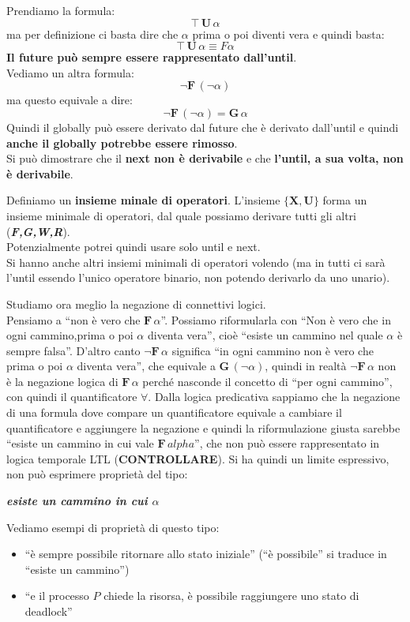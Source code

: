 \documentclass[a4paper,12pt, oneside]{book}
\begin{document}
Prendiamo la formula:
\[\top\,\mathbf{U}\,\alpha\]
ma per definizione ci basta dire che $\alpha$ prima o poi diventi vera e
quindi basta:
\[\top\,\mathbf{U}\,\alpha\equiv F\alpha\]
\textbf{Il future può sempre essere rappresentato dall'until}.\\
Vediamo un altra formula:
\[\neg\mathbf{F}\,(\neg\alpha)\]
ma questo equivale a dire:
\[\neg\mathbf{F}\,(\neg\alpha)=\mathbf{G}\,\alpha\]
Quindi il globally può essere derivato dal future che è derivato dall'until e
quindi \textbf{anche il globally potrebbe essere rimosso}.\\
Si può dimostrare che il \textbf{next non è derivabile} e che \textbf{l'until, a
  sua volta, non è derivabile}. 
\begin{definizione}
  Definiamo un \textbf{insieme minale di operatori}. L'insieme
  $\{\mathbf{X},\mathbf{U}\}$ forma un insieme minimale di operatori, dal quale
  possiamo derivare tutti gli altri (\textbf{\textit{F,G,W,R}}).\\
  Potenzialmente potrei quindi usare solo until e next.\\
  Si hanno anche altri insiemi minimali di operatori volendo (ma in tutti ci
  sarà l'until essendo l'unico operatore binario, non potendo derivarlo da uno
  unario). 
\end{definizione}
\noindent
Studiamo ora meglio la negazione di connettivi logici.\\
Pensiamo a ``non è vero che $\mathbf{F}\,\alpha$''. Possiamo riformularla con
``Non è vero che in ogni cammino,prima o poi $\alpha$ diventa vera'', cioè
``esiste un cammino nel quale $\alpha$ è sempre falsa''. D'altro canto
$\neg\mathbf{F}\,\alpha$ significa ``in ogni cammino non è vero che prima o poi
$\alpha$ diventa vera'', che equivale a $\mathbf{G}\,(\neg \alpha)$, quindi in
realtà $\neg\mathbf{F}\,\alpha$ non è la negazione logica di
$\mathbf{F}\,\alpha$ perché nasconde il concetto di ``per ogni cammino'', con
quindi il quantificatore $\forall$. Dalla logica predicativa sappiamo che la
negazione di una formula dove compare un quantificatore equivale a cambiare il
quantificatore e aggiungere la negazione e quindi la riformulazione giusta
sarebbe ``esiste un cammino in cui vale $\mathbf{F}\,alpha$'', che non può
essere rappresentato in logica temporale LTL (\textbf{CONTROLLARE}). Si ha
quindi un limite 
espressivo, non può esprimere proprietà del tipo:
\begin{center}
  \textbf{\textit{esiste un cammino in cui $\alpha$}}
\end{center}
\begin{esempio}
  Vediamo esempi di proprietà di questo tipo:
  \begin{itemize}
    \item ``è sempre possibile ritornare allo stato iniziale''
    (``è possibile'' si traduce in ``esiste un cammino'')
    \item ``e il processo $P$ chiede la risorsa, è possibile raggiungere uno
    stato di deadlock'' 
  \end{itemize}
\end{esempio}
\end{document}
